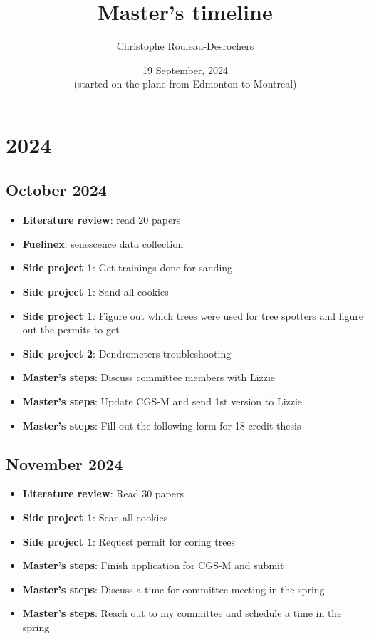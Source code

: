\documentclass{article}
\title{Master's timeline}
\author[]{Christophe Rouleau-Desrochers}
\date{19 September, 2024 \\ (started on the plane from Edmonton to Montreal)}
\begin{document}
\maketitle

\tableofcontents
\newpage


\section*{\centering \Large 2024}

\subsection*{October 2024}
\begin {itemize}
	\item \textbf{Literature review}: read 20 papers
	\item \textbf{Fuelinex}: senescence data collection
	\item \textbf{Side project 1}: Get trainings done for sanding 
	\item \textbf{Side project 1}: Sand all cookies
	\item \textbf{Side project 1}: Figure out which trees were used for tree spotters and figure out the permits to get
	\item \textbf{Side project 2}: Dendrometers troubleshooting
	\item \textbf{Master's steps}: Discuss committee members with Lizzie 
	\item \textbf{Master's steps}: Update CGS-M and send 1st version to Lizzie
	\item \textbf{Master's steps}: Fill out the following form for 18 credit thesis %
\end {itemize}


\subsection*{November 2024}
\begin{itemize}
    \item \textbf{Literature review}: Read 30 papers
    \item \textbf{Side project 1}: Scan all cookies
    \item \textbf{Side project 1}: Request permit for coring trees 
    \item \textbf{Master's steps}: Finish application for CGS-M and submit
    \item \textbf{Master's steps}: Discuss a time for committee meeting in the spring
    \item \textbf{Master's steps}: Reach out to my committee and schedule a time in the spring
\end{itemize}
\end{document}
